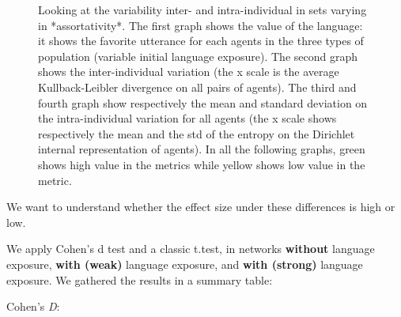 \documentclass[
]{article}
\begin{document}
\begin{figure}[!H]
\caption{Looking at the variability inter- and intra-individual in sets varying in *assortativity*. The first graph shows the value of the language: it shows the favorite utterance for each agents in the three types of population (variable initial language exposure). The second graph shows the  inter-individual variation (the x scale is the average Kullback-Leibler divergence on all pairs of agents). The third and fourth graph show respectively the mean and standard deviation on the intra-individual variation for all agents (the x scale shows respectively the mean and the std of the entropy on the Dirichlet internal representation of agents). In all the following graphs, green shows high value in the metrics while yellow shows low value in the metric.}\label{fig:unnamed-chunk-10}
\end{figure}

We want to understand whether the effect size under these differences is
high or low.

We apply Cohen's d test and a classic t.test, in networks
\textbf{without} language exposure, \textbf{with (weak)} language
exposure, and \textbf{with (strong)} language exposure. We gathered the
results in a summary table:

Cohen's \emph{D}:
\end{document}

